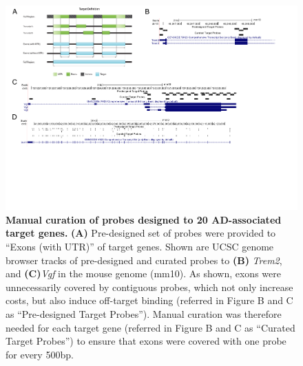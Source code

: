 \begin{landscape}
	\begin{figure}[!ht]
		\begin{center}
			\includegraphics[page=1,trim={0cm 10cm 0cm 0cm},clip,scale = 0.90]{Figures/TargetProbes_Visualisation.pdf}
		\end{center}
		\captionsetup{width=1.5\textwidth}
		\caption[Manual curation of probes designed to 20 AD-associated target genes]%
		{\textbf{Manual curation of probes designed to 20 AD-associated target genes.} \textbf{(A)} Pre-designed set of probes were provided to “Exons (with UTR)” of target genes. Shown are UCSC genome browser tracks of pre-designed and curated probes to \textbf{(B)} \textit{Trem2}, and \textbf{(C)}\textit{Vgf} in the mouse genome (mm10). As shown, exons were unnecessarily covered by contiguous probes, which not only increase costs, but also induce off-target binding (referred in Figure B and C as “Pre-designed Target Probes”). Manual curation was therefore needed for each target gene (referred in Figure B and C as “Curated Target Probes”) to ensure that exons were covered with one probe for every 500bp. }
		\label{fig:target_probes_eg}
	\end{figure}
\end{landscape}

